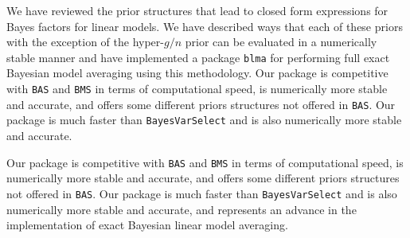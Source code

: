 We have reviewed the prior structures that lead to closed form expressions for
Bayes factors for linear models. We have described ways that each of these
priors with the exception of the hyper-$g/n$ prior can be evaluated in a
numerically stable manner and have implemented a package \texttt{blma} for
performing full exact Bayesian model averaging using this methodology. Our
package is competitive with \texttt{BAS} and \texttt{BMS} in terms of
computational speed, is numerically more stable and accurate, and offers some
different priors structures not offered in \texttt{BAS}. Our package is much
faster than \texttt{BayesVarSelect} and is also numerically more stable and
accurate.

Our package is competitive with {\tt BAS} and {\tt BMS} in terms of
computational speed, is numerically more stable and accurate, and offers some
different priors structures not offered in {\tt BAS}. Our package is much
faster than {\tt BayesVarSelect} and is also numerically more stable and
accurate, and represents an advance in the implementation of exact Bayesian
linear model averaging.
